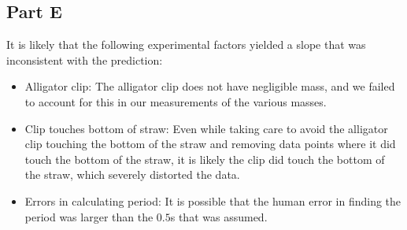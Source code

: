 \documentclass[8pt]{extarticle}
\begin{document}
{\subsection*{Part E}%
\label{sub:Part E}
It is likely that the following experimental factors yielded a slope that was inconsistent with the prediction:
\begin{itemize}
	\item Alligator clip: The alligator clip does not have negligible mass, and we failed to account for this in our measurements of the various masses.
	\item Clip touches bottom of straw: Even while taking care to avoid the alligator clip touching the bottom of the straw and removing data points where it did touch the bottom of the straw, it is likely the clip did touch the bottom of the straw, which severely distorted the data.
	\item Errors in calculating period: It is possible that the human error in finding the period was larger than the $0.5$s that was assumed.
\end{itemize}
}
\end{document}
